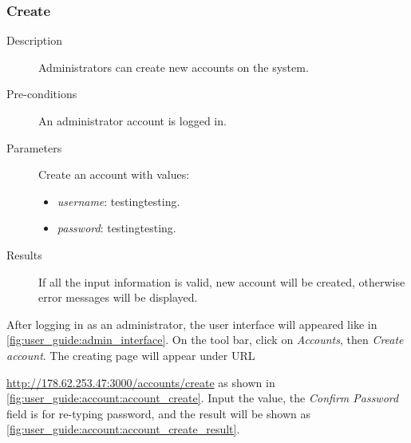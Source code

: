 \subsubsection{Create}
\label{ch:appendix-a:user_guide:account:create}

\begin{description}
\item[Description] Administrators can create new accounts on the system.
\item[Pre-conditions] An administrator account is logged in.
\item[Parameters] Create an account with values:
\begin{itemize}
\item \emph{username}: testingtesting.
\item \emph{password}: testingtesting.
\end{itemize}
\item[Results] If all the input information is valid, new account will be created, otherwise error messages will be displayed.
\end{description}

After logging in as an administrator, the user interface will appeared like in \autoref{fig:user_guide:admin_interface}.
On the tool bar, click on \emph{Accounts}, then \emph{Create account}.
The creating page will appear under URL

\noindent\href{http://178.62.253.47:3000/accounts/create}{http://178.62.253.47:3000/accounts/create} as shown in \autoref{fig:user_guide:account:account_create}.
Input the value, the \emph{Confirm Password} field is for re-typing password, and the result will be shown as \autoref{fig:user_guide:account:account_create_result}.

